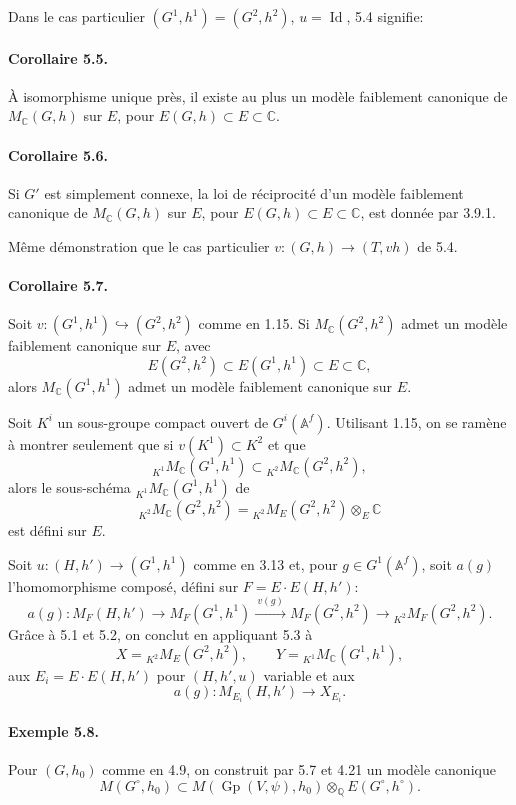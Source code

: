 \documentclass[10pt]{article}
\newcommand{\Af}{\mathbb A^f}
\newcommand{\C}{\mathbb C}
\newcommand{\Q}{\mathbb Q}
\newcommand{\Gp}{\operatorname{Gp}}
\newcommand{\MC}{M_{\C}}
\newcommand{\Id}{\operatorname{Id}}
\begin{document}
Dans le cas particulier $(G^1,h^1)=(G^2,h^2)$, $u=\Id$, 5.4 signifie:

\paragraph{Corollaire 5.5.} À isomorphisme unique près, il existe au plus un modèle faiblement canonique de $\MC(G,h)$ sur $E$, pour $E(G,h)\subset E\subset\C$.

\paragraph{Corollaire 5.6.} Si $G'$ est simplement connexe, la loi de réciprocité d'un modèle faiblement canonique de $\MC(G,h)$ sur $E$, pour $E(G,h)\subset E\subset\C$, est donnée par 3.9.1.

Même démonstration que le cas particulier $v:(G,h)\to(T,vh)$ de 5.4.

\paragraph{Corollaire 5.7.} Soit $v:(G^1,h^1)\hookrightarrow(G^2,h^2)$ comme en 1.15. Si $\MC(G^2,h^2)$ admet un modèle faiblement canonique sur $E$, avec
\[
E(G^2,h^2)\subset E(G^1,h^1)\subset E\subset\C,
\]
alors $\MC(G^1,h^1)$ admet un modèle faiblement canonique sur $E$.

Soit $K^i$ un sous-groupe compact ouvert de $G^i(\Af)$. Utilisant 1.15, on se ramène à montrer seulement que si $v(K^1)\subset K^2$ et que
\[
{}_{K^1}\MC(G^1,h^1)\subset{}_{K^2}\MC(G^2,h^2),
\]
alors le sous-schéma ${}_{K^1}\MC(G^1,h^1)$ de
\[
{}_{K^2}\MC(G^2,h^2)={}_{K^2}M_E(G^2,h^2)\otimes_E\C
\]
est défini sur $E$.

Soit $u:(H,h')\to(G^1,h^1)$ comme en 3.13 et, pour $g\in G^1(\Af)$, soit $a(g)$ l'homomorphisme composé, défini sur $F=E\cdot E(H,h')$:
\[
a(g):M_F(H,h')\longrightarrow M_F(G^1,h^1)
 \xrightarrow{\ v(g)\ } M_F(G^2,h^2)
 \longrightarrow{}_{K^2}M_F(G^2,h^2).
\]
Grâce à 5.1 et 5.2, on conclut en appliquant 5.3 à
\[
X={}_{K^2}M_E(G^2,h^2),\qquad
Y={}_{K^1}\MC(G^1,h^1),
\]
aux $E_i=E\cdot E(H,h')$ pour $(H,h',u)$ variable et aux
\[
a(g):M_{E_i}(H,h')\longrightarrow X_{E_i}.
\]

\paragraph{Exemple 5.8.} Pour $(G,h_0)$ comme en 4.9, on construit par 5.7 et 4.21 un modèle canonique
\[
M(G^\circ,h_0)\subset M(\Gp(V,\psi),h_0)\otimes_{\Q}E(G^\circ,h^\circ).
\]
\end{document}
